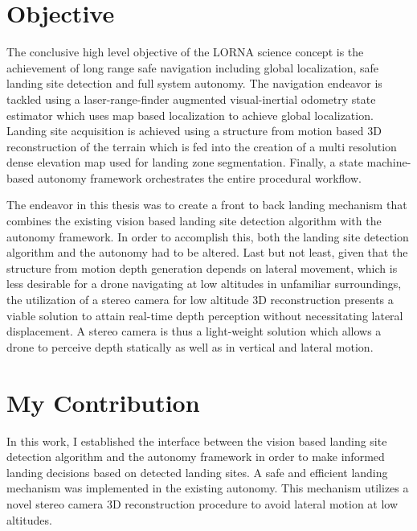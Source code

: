 \section{Objective}

The conclusive high level objective of the LORNA science concept is the achievement of long range safe navigation including global localization, safe landing site detection and full system autonomy. The navigation endeavor is tackled using a laser-range-finder augmented visual-inertial odometry state estimator which uses map based localization to achieve global localization. Landing site acquisition is achieved using a structure from motion based 3D reconstruction of the terrain which is fed into the creation of a multi resolution dense elevation map used for landing zone segmentation. Finally, a state machine-based autonomy framework orchestrates the entire procedural workflow.

The endeavor in this thesis was to create a front to back landing mechanism that combines the existing vision based landing site detection algorithm with the autonomy framework. In order to accomplish this, both the landing site detection algorithm and the autonomy had to be altered. Last but not least, given that the structure from motion depth generation depends on lateral movement, which is less desirable for a drone navigating at low altitudes in unfamiliar surroundings, the utilization of a stereo camera for low altitude 3D reconstruction presents a viable solution to attain real-time depth perception without necessitating lateral displacement. A stereo camera is thus a light-weight solution which allows a drone to perceive depth statically as well as in vertical and lateral motion.

\section{My Contribution}
In this work, I established the interface between the vision based landing site detection algorithm and the autonomy framework in order to make informed landing decisions based on detected landing sites. A safe and efficient landing mechanism was implemented in the existing autonomy. This mechanism utilizes a novel stereo camera 3D reconstruction procedure to avoid lateral motion at low altitudes.

